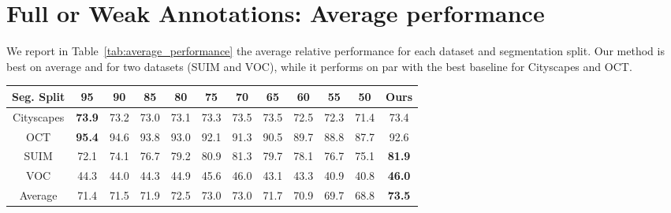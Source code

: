 \section{Full or Weak Annotations: Average performance}
\label{sec:average}

We report in Table~\ref{tab:average_performance} the average relative performance for each dataset and segmentation split. Our method is best on average and for two datasets (SUIM and VOC), while it performs on par with the best baseline for Cityscapes and OCT.

\begin{table*}[htbp]
\centering
\caption{Relative performance (in \%) against full supervision for each dataset and segmentation split.}
\label{tab:average_performance}
\begin{tabular}{@{}cccccccccccc@{}}
\toprule
Seg. Split & 95 & 90 & 85 & 80 & 75 & 70 & 65 & 60 & 55 & 50 & Ours \\ \midrule
Cityscapes & \textbf{73.9} & 73.2 & 73.0 & 73.1 & 73.3 & 73.5 & 73.5 & 72.5 & 72.3 & 71.4 & 73.4 \\
OCT & \textbf{95.4} & 94.6 & 93.8 & 93.0 & 92.1 & 91.3 & 90.5 & 89.7 & 88.8 & 87.7 & 92.6 \\
SUIM & 72.1 & 74.1 & 76.7 & 79.2 & 80.9 & 81.3 & 79.7 & 78.1 & 76.7 & 75.1 & \textbf{81.9} \\
VOC & 44.3 & 44.0 & 44.3 & 44.9 & 45.6 & 46.0 & 43.1 & 43.3 & 40.9 & 40.8 & \textbf{46.0} \\ \hline
Average & 71.4 & 71.5 & 71.9 & 72.5 & 73.0 & 73.0 & 71.7 & 70.9 & 69.7 & 68.8 & \textbf{73.5} \\ \bottomrule
\end{tabular}

\end{table*}